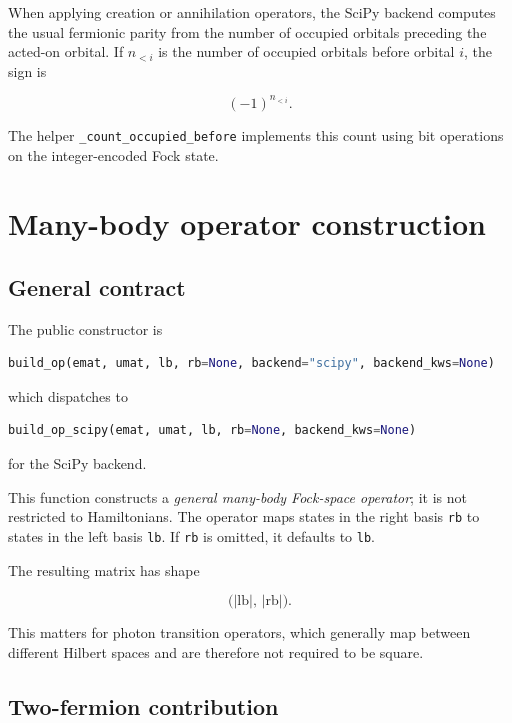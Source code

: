 \documentclass[11pt]{article}
\begin{document}
When applying creation or annihilation operators, the SciPy backend computes the usual fermionic parity from the number of occupied orbitals preceding the acted-on orbital.  If \(n_{<i}\) is the number of occupied orbitals before orbital \(i\), the sign is

\begin{equation}
  (-1)^{n_{<i}}.
\end{equation}

The helper \texttt{\_count\_occupied\_before} implements this count using bit operations on the integer-encoded Fock state.

\section{Many-body operator construction}

\subsection{General contract}

The public constructor is

\begin{lstlisting}[language=Python]
build_op(emat, umat, lb, rb=None, backend="scipy", backend_kws=None)
\end{lstlisting}

which dispatches to

\begin{lstlisting}[language=Python]
build_op_scipy(emat, umat, lb, rb=None, backend_kws=None)
\end{lstlisting}

for the SciPy backend.

This function constructs a \emph{general many-body Fock-space operator}; it is not restricted to Hamiltonians.  The operator maps states in the right basis \texttt{rb} to states in the left basis \texttt{lb}.  If \texttt{rb} is omitted, it defaults to \texttt{lb}.

The resulting matrix has shape

\begin{equation}
  \bigl(\lvert \mathrm{lb}\rvert,\,\lvert \mathrm{rb}\rvert\bigr).
\end{equation}

This matters for photon transition operators, which generally map between different Hilbert spaces and are therefore not required to be square.

\subsection{Two-fermion contribution}
\end{document}
